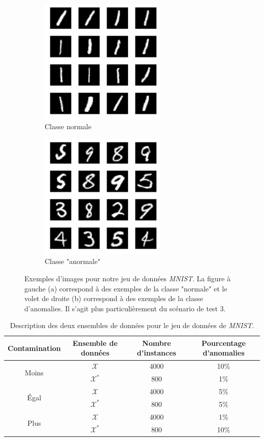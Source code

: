 \begin{figure}[htb]
	\centering
	\begin{subfigure}{6cm}
		\centering\includegraphics[width=6cm]{images/mnist-inliers}
		\caption{Classe normale}
	\end{subfigure}
	\begin{subfigure}{6cm}
		\centering\includegraphics[width=6cm]{images/mnist-outliers}
		\caption{Classe "anormale"}
	\end{subfigure}
	\caption[Exemples d'images pour notre jeu de données \textit{MNIST}.]{Exemples d'images pour notre jeu de données \textit{MNIST}. La figure à gauche (a) correspond à des exemples de la classe "normale" et le volet de droite (b) correspond à des exemples de la classe d'anomalies. Il s'agit plus particulièrement du scénario de test 3.}
	\label{fig:mnist}
\end{figure}

\begin{table}[h]
	\centering
	\caption{Description des deux ensembles de données pour le jeu de données de \textit{MNIST}.}
	\begin{tabular}{| c | c | c | c |}
		\hline
		\rowcolor{Gray}
		Contamination & Ensemble de données  & Nombre d'instances & Pourcentage d'anomalies  \\
		\hline
		\multirow{2}{*}{Moins} 
		& $\mathcal{X}$ & 4000 & 10\%  \\
		& $\mathcal{X^*}$  & 800 & 1\%  \\ 
		\midrule
		\multirow{2}{*}{Égal} 
		& $\mathcal{X}$ & 4000 & 5\%  \\
		& $\mathcal{X^*}$  & 800 & 5\%  \\ 
		\midrule
		\multirow{2}{*}{Plus} 
		& $\mathcal{X}$ & 4000 & 1\%  \\
		& $\mathcal{X^*}$  & 800 & 10\%  \\ 
		\midrule
	\end{tabular}
	\label{tab:dataset2}
\end{table}

